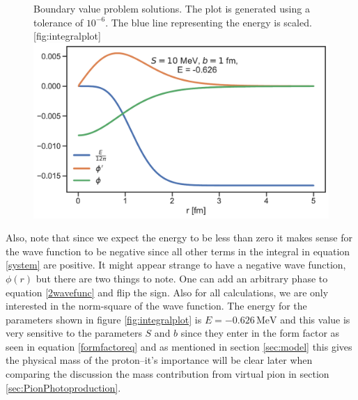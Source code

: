 \begin{figure}[H]
	\begin{sidecaption}{Boundary value problem solutions. The plot is generated using a tolerance of $10^{-6}$. The blue line representing the energy is scaled.}[fig:integralplot]
		\includegraphics[width=\linewidth]{Figures/Integralplot.pdf}
	\end{sidecaption}
\end{figure}
Also, note that since we expect the energy to be less than zero it makes sense for the wave function to be negative since all other terms in the integral in equation \eqref{system} are positive. It might appear strange to have a negative wave function, $\phi(r)$ but there are two things to note. One can add an arbitrary phase to equation \eqref{2wavefunc} and flip the sign. Also for all calculations, we are only interested in the norm-square of the wave function. The energy for the parameters shown in figure \ref{fig:integralplot} is $E = -0.626 \, \text{MeV}$ and this value is very sensitive to the parameters $S$ and $b$ since they enter in the form factor as seen in equation \eqref{formfactoreq} and as mentioned in section \ref{sec:model} this gives the physical mass of the proton--it's importance will be clear later when comparing the discussion the mass contribution from virtual pion in section \ref{sec:PionPhotoproduction}.

